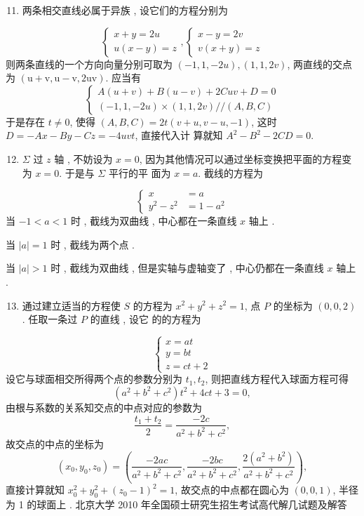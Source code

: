 \documentclass[10pt]{article}
\begin{document}
\begin{enumerate}
  \setcounter{enumi}{10}
  \item  两条相交直线必属于异族 ,  设它们的方程分别为 
\end{enumerate}
$$
\left\{\begin{array}{r}
x+y=2 u \\
u(x-y)=z
\end{array},\left\{\begin{array}{r}
x-y=2 v \\
v(x+y)=z
\end{array}\right.\right.
$$
 则两条直线的一个方向向量分别可取为  $(-1,1,-2 u),(1,1,2 v)$,  两直线的交点为  $(\mathrm{u}+\mathrm{v}, \mathrm{u}-\mathrm{v}, 2 \mathrm{uv})$.  应当有 
$$
\left\{\begin{array}{c}
A(u+v)+B(u-v)+2 C u v+D=0 \\
(-1,1,-2 u) \times(1,1,2 v) / /(A, B, C)
\end{array}\right.
$$
 于是存在  $t \neq 0$,  使得  $(A, B, C)=2 t(v+u, v-u,-1)$,  这时  $D=-A x-B y-C z=-4 u v t$,  直接代入计   算就知  $A^{2}-B^{2}-2 C D=0$.

\begin{enumerate}
  \setcounter{enumi}{11}
  \item $\Sigma$  过  $z$  轴 ,  不妨设为  $x=0$,  因为其他情况可以通过坐标变换把平面的方程变为  $x=0$.  于是与  $\Sigma$  平行的平   面为  $x=a$.  截线的方程为 
\end{enumerate}
$$
\left\{\begin{aligned}
x &=a \\
y^{2}-z^{2} &=1-a^{2}
\end{aligned}\right.
$$
 当  $-1<a<1$  时 ,  截线为双曲线 ,  中心都在一条直线  $x$  轴上 .

 当  $|a|=1$  时 ,  截线为两个点 .

 当  $|a|>1$  时 ,  截线为双曲线 ,  但是实轴与虚轴变了 ,  中心仍都在一条直线  $x$  轴上 .

\begin{enumerate}
  \setcounter{enumi}{12}
  \item  通过建立适当的方程使  $S$  的方程为  $x^{2}+y^{2}+z^{2}=1$,  点  $P$  的坐标为  $(0,0,2)$.  任取一条过  $P$  的直线 ,  设它   的的方程为 
\end{enumerate}
$$
\left\{\begin{array}{l}
x=a t \\
y=b t \\
z=c t+2
\end{array}\right.
$$
 设它与球面相交所得两个点的参数分别为  $t_{1}, t_{2}$,  则把直线方程代入球面方程可得 
$$
\left(a^{2}+b^{2}+c^{2}\right) t^{2}+4 c t+3=0,
$$
 由根与系数的关系知交点的中点对应的参数为 
$$
\frac{t_{1}+t_{2}}{2}=\frac{-2 c}{a^{2}+b^{2}+c^{2}},
$$
 故交点的中点的坐标为 
$$
\left(x_{0}, y_{0}, z_{0}\right)=\left(\frac{-2 a c}{a^{2}+b^{2}+c^{2}}, \frac{-2 b c}{a^{2}+b^{2}+c^{2}}, \frac{2\left(a^{2}+b^{2}\right)}{a^{2}+b^{2}+c^{2}}\right),
$$
 直接计算就知  $x_{0}^{2}+y_{0}^{2}+\left(z_{0}-1\right)^{2}=1$,  故交点的中点都在圆心为  $(0,0,1)$,  半径为  1  的球面上 .  北京大学 2010 年全国硕士研究生招生考试高代解几试题及解答 
\end{document}
